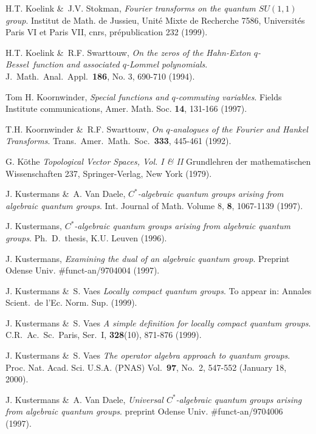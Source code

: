 \begin{thebibliography}{99}
 {\sc H.T. Koelink \&\ J.V. Stokman},
   {\em Fourier transforms on the quantum $SU(1,1)$ group}\@.
    Institut de Math. de Jussieu, Unit\'e Mixte de Recherche 7586,
    Universit\'es Paris VI et Paris VII, {\sc cnrs},
    pr\'epublication 232 (1999).

 {\sc H.T. Koelink \&\ R.F. Swarttouw},
   {\em On the zeros of the Hahn-Exton \mbox{$q$-Bessel}\ function and associated $q$-Lommel
   polynomials}\@. J.\ Math.\ Anal.\ Appl.\ {\bf 186}, No. 3, 690-710 (1994).

 {\sc Tom H. Koornwinder},
   {\em Special functions and $q$-commuting variables}\@.
   Fields Institute communications,  Amer. Math. Soc\@.  {\bf 14}, 131-166 (1997).

 {\sc T.H. Koornwinder \&\ R.F. Swarttouw},
   {\em On $q$-analogues of the Fourier and Hankel Transforms}\@.
   Trans.\ Amer.\ Math.\ Soc.\ {\bf 333}, 445-461 (1992).

 {\sc G. K\"othe}
   {\em Topological Vector Spaces, Vol. I \& II}
   Grundlehren der mathematischen Wissenschaften 237,
   Springer-Verlag, New York (1979).

 {\sc J. Kustermans \&\ A. Van Daele},
   {\em $C^*$-algebraic quantum groups arising from algebraic quantum groups}\@.
   Int. Journal of Math. Volume 8, {\bf 8}, 1067-1139 (1997).

 {\sc J. Kustermans},
   {\em $C^*$-algebraic quantum groups arising from algebraic quantum groups}\@.
    Ph.\ D.\ thesis, K.U. Leuven (1996).

 {\sc J. Kustermans},
   {\em Examining the dual of an algebraic quantum group}\@.
   Preprint Odense Univ. \#funct-an/9704004 (1997).

 {\sc J. Kustermans \&\ S. Vaes}
   {\em Locally compact quantum groups}\@.
   To appear in: Annales Scient.\ de l'Ec. Norm. Sup. (1999).

 {\sc J. Kustermans \&\ S. Vaes}
   {\em A simple definition for locally compact quantum groups}\@.
   C.R.\ Ac.\ Sc.\ Paris, Ser.\ I, {\bf 328}(10), 871-876 (1999).

 {\sc J. Kustermans \&\ S. Vaes}
   {\em The operator algebra approach to quantum groups}\@.
   Proc. Nat. Acad. Sci. U.S.A. (PNAS)
   Vol.\ {\bf 97}, No.\ 2, 547-552 (January 18, 2000).

 {\sc J. Kustermans \&\ A. Van Daele},
  {\em Universal $C^*$-algebraic quantum groups arising from algebraic quantum groups}\@.
   preprint Odense Univ. \#funct-an/9704006 (1997).


\end{thebibliography}
